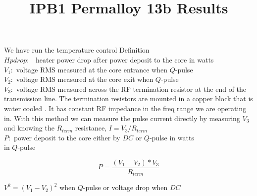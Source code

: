 \documentclass{article}
\title{IPB1 Permalloy 13b Results}
\begin{document}
\maketitle

We have run the temperature control 
Definition\\

$Hpdrop:$ \ heater power drop after power deposit to the core in watts\\

$V_{1}:$ voltage RMS measured at the core entrance when $Q$-pulse\\

$V_{2}:$ voltage RMS measured at the core exit when $Q$-pulse\\

$V_{3}:$ voltage RMS measured across the RF termination resistor at the end of the transmission line. The termination resistors are mounted in a copper block that is water cooled . It has constant RF impedance in the freq range we are operating in. With this method we can measure the pulse current directly by measuring $V_{3}$ and knowing the $R_{term}$ resistance, $I = V_{3} / R_{term}$ \\

$P:$ power deposit to the core either by $DC$ or $Q$-pulse in watts\\
in $Q$-pulse 

\begin{equation}
P=\frac{(V_{1}-V_{2})*V_{3}}{R_{term}} \label{1}%
\end{equation}
%

$V^{2}=(V_{1}-V_{2})^{2}$ when $Q$-pulse or voltage drop when $DC$ \\
\end{document}
